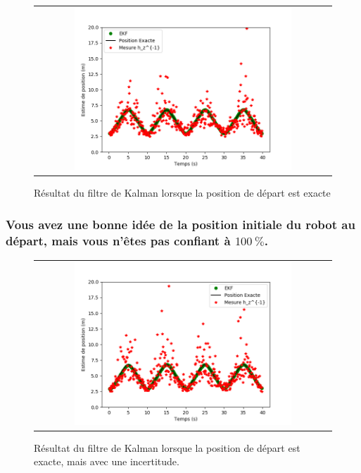 \documentclass[12pt]{article}
\begin{document}
\begin{figure}[ht]
 \begin{center}
  \begin{tabular}{c}
    \includegraphics[width=0.75\textwidth]{fig/kalman-position-exacte.png}
  \end{tabular}
 \end{center}
\vspace{-0.25in}
 \caption{Résultat du filtre de Kalman lorsque la position de départ est exacte}
    \label{kalman-position-exacte}
\end{figure}

\subsubsection{Vous avez une bonne idée de la position initiale du robot au départ, mais vous n'êtes pas confiant à $100~\%$.}

\begin{figure}[ht]
 \begin{center}
  \begin{tabular}{c}
    \includegraphics[width=0.75\textwidth]{fig/kalman-position-exacte-incertitude.png}
  \end{tabular}
 \end{center}
\vspace{-0.25in}
    \caption{Résultat du filtre de Kalman lorsque la position de départ est exacte, mais avec une incertitude.}
    \label{kalman-position-exacte-incertitude}
\end{figure}
\end{document}

